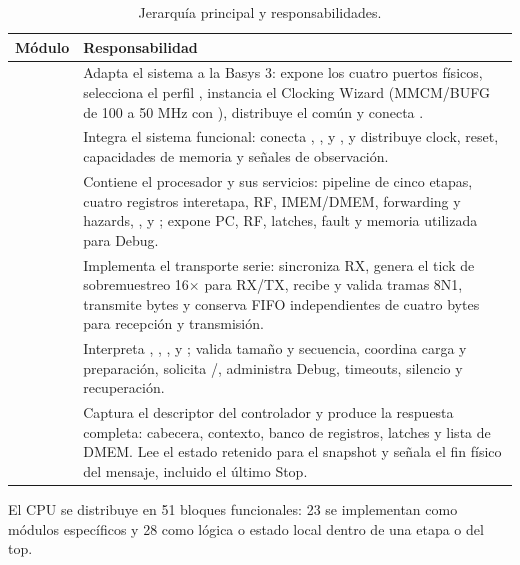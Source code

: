 \begin{table}[H]
  \centering
  \small
  \begin{tabularx}{\textwidth}{L{4.8cm}Y}
    \toprule
    \textbf{Módulo} & \textbf{Responsabilidad} \\
    \midrule
     & Adapta el sistema a la Basys 3: expone los cuatro
    puertos físicos, selecciona el perfil ,
    instancia el Clocking
    Wizard (MMCM/BUFG de 100 a 50 MHz con ), distribuye el
     común y conecta . \\ \addlinespace
     & Integra el sistema funcional: conecta
    , ,
     y , y distribuye clock,
    reset, capacidades de memoria y señales de observación. \\ \addlinespace
     & Contiene el procesador y sus servicios: pipeline de
    cinco etapas, cuatro registros interetapa, RF, IMEM/DMEM, forwarding y
    hazards, ,  y
    ; expone PC, RF, latches, fault y memoria
    utilizada para Debug. \\ \addlinespace
     & Implementa el transporte serie: sincroniza RX, genera
    el tick de sobremuestreo 16$\times$ para RX/TX, recibe y valida tramas
    8N1, transmite bytes y conserva FIFO independientes de cuatro bytes para
    recepción y transmisión. \\ \addlinespace
     & Interpreta , ,
    ,  y ; valida tamaño y secuencia,
    coordina carga y preparación, solicita /, administra
    Debug, timeouts, silencio y recuperación. \\ \addlinespace
     & Captura el descriptor del controlador y
    produce la respuesta completa: cabecera, contexto, banco de registros,
    latches y lista de DMEM. Lee el estado retenido para el snapshot y señala
    el fin físico del mensaje, incluido el último Stop. \\
    \bottomrule
  \end{tabularx}
  \caption{Jerarquía principal y responsabilidades.}
  \label{tab:jerarquia}
\end{table}

El CPU se distribuye en 51 bloques funcionales: 23 se implementan
como módulos específicos y 28 como lógica o estado local dentro de
una etapa o del top.

